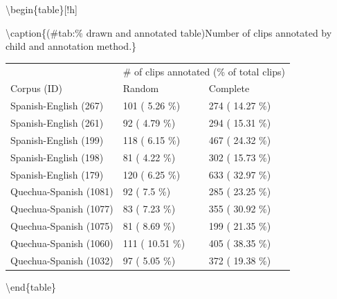 \documentclass[
]{article}
\begin{document}
\textbackslash begin\{table\}{[}!h{]}

\textbackslash caption\{(\#tab:\% drawn and annotated table)Number of clips annotated by child and annotation method.\}
\centering

\begin{tabular}[t]{lll}
\toprule
\multicolumn{1}{c}{ } & \multicolumn{2}{c}{\# of clips annotated (\% of total clips)} \\
\cmidrule(l{3pt}r{3pt}){2-3}
Corpus (ID) & Random & Complete\\
\midrule
Spanish-English (267) & 101 ( 5.26 \%) & 274 ( 14.27 \%)\\
Spanish-English (261) & 92 ( 4.79 \%) & 294 ( 15.31 \%)\\
Spanish-English (199) & 118 ( 6.15 \%) & 467 ( 24.32 \%)\\
Spanish-English (198) & 81 ( 4.22 \%) & 302 ( 15.73 \%)\\
Spanish-English (179) & 120 ( 6.25 \%) & 633 ( 32.97 \%)\\
\addlinespace
Quechua-Spanish (1081) & 92 ( 7.5 \%) & 285 ( 23.25 \%)\\
Quechua-Spanish (1077) & 83 ( 7.23 \%) & 355 ( 30.92 \%)\\
Quechua-Spanish (1075) & 81 ( 8.69 \%) & 199 ( 21.35 \%)\\
Quechua-Spanish (1060) & 111 ( 10.51 \%) & 405 ( 38.35 \%)\\
Quechua-Spanish (1032) & 97 ( 5.05 \%) & 372 ( 19.38 \%)\\
\bottomrule
\end{tabular}

\textbackslash end\{table\}
\end{document}
